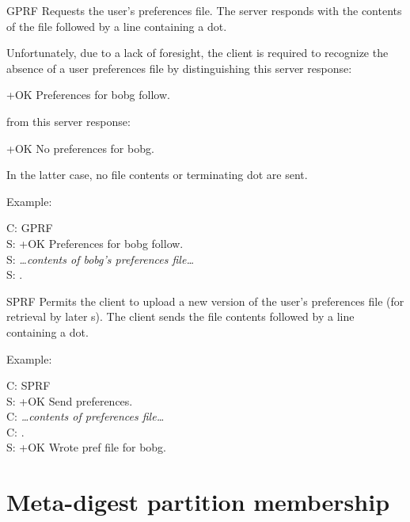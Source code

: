 \begin{codelist}
\item[GPRF] Requests the user's preferences file.  The server responds
with the contents of the file followed by a line containing a dot.

Unfortunately, due to a lack of foresight, the client is required to
recognize the absence of a user preferences file by distinguishing
this server response:

\begin{example}
+OK Preferences for bobg follow.
\end{example}

\noindent
from this server response:

\begin{example}
+OK No preferences for bobg.
\end{example}

In the latter case, no file contents or terminating dot are sent.

Example:

\begin{conversation}
C: GPRF \\
S: +OK Preferences for bobg follow. \\
S: {\it \ldots{}contents of bobg's preferences file\ldots{}} \\
S: .
\end{conversation}

\item[SPRF] Permits the client to upload a new version of the user's
preferences file (for retrieval by later s).  The client
sends the file contents followed by a line containing a dot.

Example:

\begin{conversation}
C: SPRF \\
S: +OK Send preferences. \\
C: {\it \ldots{}contents of preferences file\ldots{}} \\
C: . \\
S: +OK Wrote pref file for bobg.
\end{conversation}
\end{codelist}

\appendix

\section{Meta-digest partition membership}

